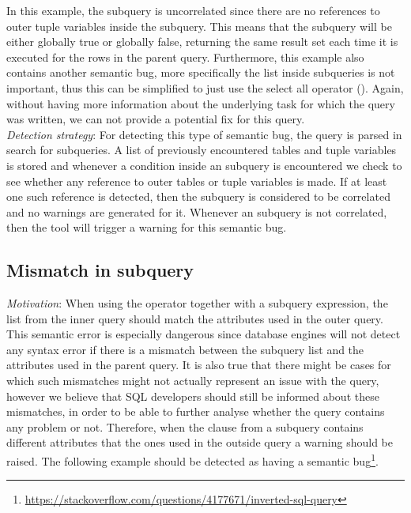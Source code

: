 In this example, the  subquery is uncorrelated since there are no references to outer tuple variables inside the subquery. This means that the subquery will be either globally true or globally false, returning the same result set each time it is executed for the rows in the parent query. Furthermore, this example also contains another semantic bug, more specifically the  list inside  subqueries is not important, thus this can be simplified to just use the select all operator (\sql{*}). Again, without having more information about the underlying task for which the query was written, we can not provide a potential fix for this query.\\

\noindent \emph{Detection strategy}: For detecting this type of semantic bug, the query is parsed in search for  subqueries. A list of previously encountered tables and tuple variables is stored and whenever a condition inside an  subquery is encountered we check to see whether any reference to outer tables or tuple variables is made. If at least one such reference is detected, then the  subquery is considered to be correlated and no warnings are generated for it. Whenever an  subquery is not correlated, then the tool will trigger a warning for this semantic bug.

\subsection{Mismatch in subquery }
\emph{Motivation}: When using the  operator together with a subquery expression, the  list from the inner query should match the attributes used in the outer query. This semantic error is especially dangerous since database engines will not detect any syntax error if there is a mismatch between the subquery  list and the attributes used in the parent query. It is also true that there might be cases for which such mismatches might not actually represent an issue with the query, however we believe that SQL developers should still be informed about these mismatches, in order to be able to further analyse whether the query contains any problem or not. Therefore, when the  clause from a subquery contains different attributes that the ones used in the outside query a warning should be raised. The following example should be detected as having a semantic bug\footnote{\url{https://stackoverflow.com/questions/4177671/inverted-sql-query}}.

